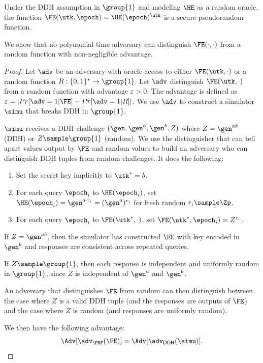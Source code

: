 \begin{lemma}\label{lem:txid-fe-prf} Under the DDH assumption in $\group{1}$
and modeling $\HE$ as a random oracle, the function $\FE(\utk, \epoch) =
\HE(\epoch)^{\utk}$ is a secure pseudorandom function.  \end{lemma}

We show that no polynomial-time adversary can distinguish $\FE(\cdot, \cdot)$
from a random function with non-negligible advantage.

\begin{proof}

  Let $\adv$ be an adversary with oracle access to either $\FE(\utk, \cdot)$ or
  a random function $R: \{0,1\}^* \to \group{1}$. Let $\adv$ distinguish
  $\FE(\utk, \cdot)$ from a random function with advantage $\varepsilon > 0$.
  The advantage is defined as $\varepsilon = | Pr[\adv = 1 | \FE] - Pr[\adv = 1
  | R]|$.  We use $\adv$ to construct a simulator $\simu$ that breaks DDH in
  $\group{1}$.

  $\simu$ receives a DDH challenge $(\gen, \gen^a, \gen^b, Z)$ where $Z =
  \gen^{ab}$ (DDH) or $Z \sample \group{1}$ (random). We use the distinguisher
  that can tell apart values output by $\FE$  and random values to build an
  adversary who can distinguish DDH tuples from random challenges.  It does the
  following:

  \begin{enumerate}

    \item Set the secret key implicitly to $\utk^* = b$.

    \item For each query $\epoch_i$ to $\HE(\epoch_i)$, set $\HE(\epoch_{i}) =
      \gen^{a \cdot {r_i}} = (\gen^a)^{r_i} $ for fresh random $r_i \sample
      \Zp$.

    \item For each query $\epoch_i$ to $\FE(\utk^*, \cdot)$, set $\FE(\utk^*,
      \epoch_{i}) = Z^{r_i}$.

  \end{enumerate}

  If $Z = \gen^{ab}$, then the simulator has constructed $\FE$ with key encoded
  in $\gen^b$ and responses are consistent across repeated queries.

  If $Z \sample \group{1}$, then each response is independent and uniformly
  random in $\group{1}$, since $Z$ is independent of $\gen^a$ and $\gen^b$.

  An adversary that distinguishes $\FE$ from random can then distinguish
  between the case where $Z$ is a valid DDH tuple (and the responses are
  outputs of $\FE$) and the case where $Z$ is random (and responses are
  uniformly random).

  We then have the following advantage:
%
  \begin{equation*}
%
    \Adv[\adv_{\PRF}(\FE)] = \Adv[\adv_\mathsf{DDH}(\simu)].
%
  \end{equation*}
%
\end{proof}

